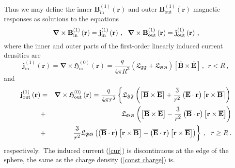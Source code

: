 \documentclass[12pt]{article}
\begin{document}
Thus we may define the inner $\mathbf{B}_{\mathrm{in}}^{\left( 1\right)
}\left( \mathbf{r}\right) $ and outer $\mathbf{B}_{\mathrm{out}}^{\left(
1\right) }\left( \mathbf{r}\right) $ magnetic responses as solutions to the
equations%
\begin{equation}
\boldsymbol{\nabla }\times \mathbf{B}_{\mathrm{in}}^{\left( 1\right) }\left( 
\mathbf{r}\right) =\mathbf{j}_{\mathrm{in}}^{\left( 1\right) }\left( \mathbf{%
r}\right) \,,\ \ \boldsymbol{\nabla }\times \mathbf{B}_{\mathrm{out}%
}^{\left( 1\right) }\left( \mathbf{r}\right) =\mathbf{j}_{\mathrm{out}%
}^{\left( 1\right) }\left( \mathbf{r}\right) \,,  \label{B1eqs}
\end{equation}%
where the inner and outer parts of the first-order linearly induced current
densities are%
\begin{equation}
\mathbf{j}_{\mathrm{in}}^{\left( 1\right) }\left( \mathbf{r}\right) =%
\boldsymbol{\nabla }\times \mathbf{\mathfrak{H}}_{\mathrm{in}}^{(0)}\left( 
\mathbf{r}\right) =\frac{q}{4\pi R^{3}}\left( \mathfrak{L}_{\mathfrak{FF}}+%
\mathfrak{L}_{\mathfrak{GG}}\right) \left[ \mathbf{\overline{B}}\times 
\overline{\mathbf{E}}\right] \,,\ \ r<R\,,  \label{nlin}
\end{equation}%
and%
\begin{eqnarray}
\mathbf{j}_{\mathrm{out}}^{\left( 1\right) }\left( \mathbf{r}\right) &=&%
\boldsymbol{\nabla }\times \mathbf{\mathfrak{H}}_{\mathrm{out}}^{(0)}\left( 
\mathbf{r}\right) =\frac{q}{4\pi r^{3}}\left\{ \mathfrak{L}_{\mathfrak{FF}%
}\left( \left[ \overline{\mathbf{B}}\times \overline{\mathbf{E}}\right] +%
\frac{3}{r^{2}}\left( \overline{\mathbf{E}}\cdot \mathbf{r}\right) \left[ 
\mathbf{r}\times \overline{\mathbf{B}}\right] \right) \right.  \notag \\
&+&\mathfrak{L}_{\mathfrak{GG}}\left( \left[ \overline{\mathbf{B}}\times 
\overline{\mathbf{E}}\right] -\frac{3}{r^{2}}\left( \mathbf{\overline{B}}%
\cdot \mathbf{r}\right) \left[ \mathbf{r}\times \overline{\mathbf{E}}\right]
\right)  \notag \\
&+&\left. \frac{3}{r^{2}}\mathfrak{L}_{\mathfrak{FG}}\left( \left( \mathbf{%
\overline{B}}\cdot \mathbf{r}\right) \left[ \mathbf{r}\times \overline{%
\mathbf{B}}\right] -\left( \overline{\mathbf{E}}\cdot \mathbf{r}\right) %
\left[ \mathbf{r}\times \overline{\mathbf{E}}\right] \right) \right\} \,,\ \
r\geq R\,.  \label{nlout}
\end{eqnarray}%
respectively.\textrm{\ }The induced current (\ref{cur}) is discontinuous at
the edge of the sphere, the same as the charge density (\ref{const charge})
is.
\end{document}
